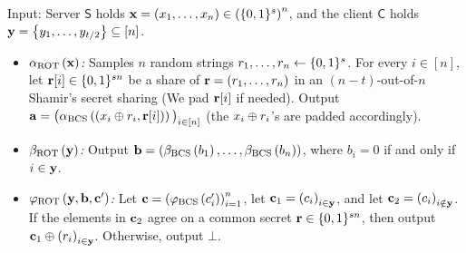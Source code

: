 \documentclass{llncs}
\newcommand{\bOT}[2]{\binom{#2}{#1}\text{-bit-OT}}
\newcommand{\sOT}[3]{\binom{#2}{#1}\text{-}#3\text{-string-OT}}
\newcommand{\rampOT}{\operatorname{ROT}}
\newcommand{\stb}{\operatorname{BCS}}
\newcommand{\INT}{\Pi_{\operatorname{int}}}
\renewcommand{\b}{\myvec{b}}
\renewcommand{\a}{\myvec{a}}
\renewcommand{\c}{\myvec{c}}
\newcommand{\x}{\myvec{x}}
\newcommand{\y}{\myvec{y}}
\newcommand{\srvr}{\alpha}
\newcommand{\clnt}{\beta}
\newcommand{\local}{\varphi}
\renewcommand{\Sc}{\mathsf{S}}
\newcommand{\Cc}{\mathsf{C}}
\begin{document}
\begin{construction}[$\Pi_{\rampOT}$]~

Input: Server $\Sc$ holds $\x=\vect{x_1,\ldots,x_n}\in\left(\zo^{s}\right)^n$, and the client $\Cc$ holds $\y=\set{y_1,\ldots,y_{t/2}}\su[n]$.

\begin{itemize}
	\item $\srvr_{\rampOT}\of{\x}$\emph{:} Samples $n$ random strings $r_1,\ldots,r_n\leftarrow\{0,1\}^s$. For every $i\in[n]$, let ${\bf r}[i]\in\{0,1\}^{sn}$ be a share of ${\bf r}=(r_1,\ldots,r_n)$ in an $(n-t)$-out-of-$n$ Shamir's secret sharing (We pad ${\bf r}[i]$ if needed). Output $\a = \big(\srvr_{\stb}\of{(x_i\oplus r_i,\myvec{r}[i])}\big)_{i\in[n]}$ (the $x_i\oplus r_i$'s are padded accordingly).
            
	\item $\clnt_{\rampOT}\of{\y}$\emph{:} Output 
    $\b=(\clnt_{\stb}\of{b_1},\ldots,\clnt_{\stb}\of{b_n})$, where $b_i=0$ if and only if $i\in\y$.
            
	\item $\local_{\rampOT}\of{\y,\b,\c'}$\emph{:} Let $\c=\vect{\local_{\stb}\of{c'_i}}_{i=1}^{n}$, let $\c_1=\vect{c_i}_{i\in\y}$, and let $\c_2=\vect{c_i}_{i\notin\y}$. If the elements in $\c_2$ agree on a common secret ${\bf r}\in\{0,1\}^{sn}$, then output $\c_1\xor\vect{r_i}_{i\in\y}$. Otherwise, output $\bot$.
            
	\end{itemize}
\end{construction}
\end{document}
